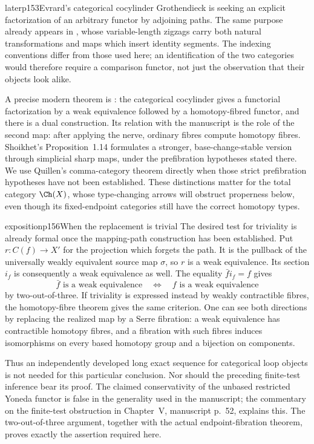 \begin{dcomment}{later}{p153}{Evrard's categorical cocylinder}
Grothendieck is seeking an explicit factorization of an arbitrary functor by adjoining paths. The same purpose already appears in \citet[\S I.1]{Evrard1975}, whose variable-length zigzags carry both natural transformations and maps which insert identity segments. The indexing conventions differ from those used here; an identification of the two categories would therefore require a comparison functor, not just the observation that their objects look alike.

A precise modern theorem is \citet[Theorem~2.8]{Shoikhet2016}: the categorical cocylinder gives a functorial factorization by a weak equivalence followed by a homotopy-fibred functor, and there is a dual construction. Its relation with the manuscript is the role of the second map: after applying the nerve, ordinary fibres compute homotopy fibres. Shoikhet's Proposition~1.14 formulates a stronger, base-change-stable version through simplicial sharp maps, under the prefibration hypotheses stated there. We use Quillen's comma-category theorem directly when those strict prefibration hypotheses have not been established. These distinctions matter for the total category $\Ch(X)$, whose type-changing arrows will obstruct properness below, even though its fixed-endpoint categories still have the correct homotopy types.
\end{dcomment}

\begin{dcomment}{exposition}{p156}{When the replacement is trivial}
The desired test for triviality is already formal once the mapping-path construction has been established. Put $r:C(f)\to X'$ for the projection which forgets the path. It is the pullback of the universally weakly equivalent source map $\sigma$, so $r$ is a weak equivalence. Its section $i_f$ is consequently a weak equivalence as well. The equality $\bar f i_f=f$ gives
\[
 \bar f\text{ is a weak equivalence}\quad\Longleftrightarrow\quad
 f\text{ is a weak equivalence}
\]
by two-out-of-three. If triviality is expressed instead by weakly contractible fibres, the homotopy-fibre theorem gives the same criterion. One can see both directions by replacing the realized map by a Serre fibration: a weak equivalence has contractible homotopy fibres, and a fibration with such fibres induces isomorphisms on every based homotopy group and a bijection on components.

Thus an independently developed long exact sequence for categorical loop objects is not needed for this particular conclusion. Nor should the preceding finite-test inference bear its proof. The claimed conservativity of the unbased restricted Yoneda functor is false in the generality used in the manuscript; the commentary on the finite-test obstruction in Chapter~V, manuscript p.~52, explains this. The two-out-of-three argument, together with the actual endpoint-fibration theorem, proves exactly the assertion required here.
\end{dcomment}

